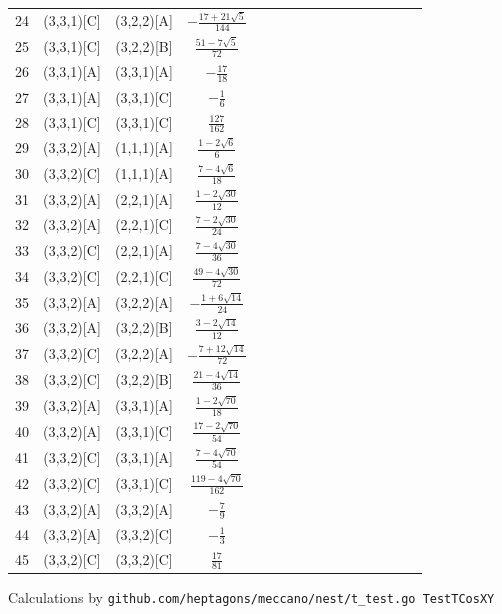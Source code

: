 \documentclass[11pt]{article}
\begin{document}
\begin{longtable}{ | p{1cm}| *{15}{c|} }
24 & (3,3,1)[C] & (3,2,2)[A] & $-\frac{17+21\sqrt{5}}{144}$\\ %
25 & (3,3,1)[C] & (3,2,2)[B] & $\frac{51-7\sqrt{5}}{72}$\\ %
26 & (3,3,1)[A] & (3,3,1)[A] & $-\frac{17}{18}$\\ %
27 & (3,3,1)[A] & (3,3,1)[C] & $-\frac{1}{6}$\\ %
28 & (3,3,1)[C] & (3,3,1)[C] & $\frac{127}{162}$\\ %
29 & (3,3,2)[A] & (1,1,1)[A] & $\frac{1-2\sqrt{6}}{6}$\\ %
30 & (3,3,2)[C] & (1,1,1)[A] & $\frac{7-4\sqrt{6}}{18}$\\ %
31 & (3,3,2)[A] & (2,2,1)[A] & $\frac{1-2\sqrt{30}}{12}$\\ %
32 & (3,3,2)[A] & (2,2,1)[C] & $\frac{7-2\sqrt{30}}{24}$\\ %
33 & (3,3,2)[C] & (2,2,1)[A] & $\frac{7-4\sqrt{30}}{36}$\\ %
34 & (3,3,2)[C] & (2,2,1)[C] & $\frac{49-4\sqrt{30}}{72}$\\ %
35 & (3,3,2)[A] & (3,2,2)[A] & $-\frac{1+6\sqrt{14}}{24}$\\ %
36 & (3,3,2)[A] & (3,2,2)[B] & $\frac{3-2\sqrt{14}}{12}$\\ %
37 & (3,3,2)[C] & (3,2,2)[A] & $-\frac{7+12\sqrt{14}}{72}$\\ %
38 & (3,3,2)[C] & (3,2,2)[B] & $\frac{21-4\sqrt{14}}{36}$\\ %
39 & (3,3,2)[A] & (3,3,1)[A] & $\frac{1-2\sqrt{70}}{18}$\\ %
40 & (3,3,2)[A] & (3,3,1)[C] & $\frac{17-2\sqrt{70}}{54}$\\ %
41 & (3,3,2)[C] & (3,3,1)[A] & $\frac{7-4\sqrt{70}}{54}$\\ %
42 & (3,3,2)[C] & (3,3,1)[C] & $\frac{119-4\sqrt{70}}{162}$\\ %
43 & (3,3,2)[A] & (3,3,2)[A] & $-\frac{7}{9}$\\ %
44 & (3,3,2)[A] & (3,3,2)[C] & $-\frac{1}{3}$\\ %
45 & (3,3,2)[C] & (3,3,2)[C] & $\frac{17}{81}$\\ %
\end{longtable}
Calculations by \texttt{github.com/heptagons/meccano/nest/t\_test.go TestTCosXY}
\end{document}
